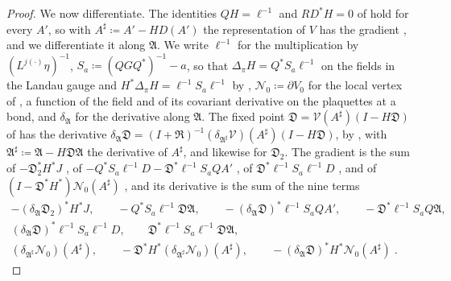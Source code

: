 \documentclass[11pt]{preprint}
\numberwithin{equation}{section}
\theoremstyle{definition}
\theoremstyle{remark}
\theoremstyle{plain}
\begin{document}
\begin{proof}
We now differentiate. The identities $QH = \ell^{-1}$ and $RD^*H = 0$ of \cite[(45)]{BalabanVAR} hold for every $A'$, so with $A^\sharp \coloneqq A' - HD(A')$ the representation \cite[(80)]{BalabanVAR} of $V$ has the gradient \cite[(85), (88)--(93)]{BalabanVAR}, and we differentiate it along $\mathfrak A$. We write $\ell^{-1}$ for the multiplication by $(L^{j(\cdot)}\eta)^{-1}$, $S_a \coloneqq (QGQ^*)^{-1} - a$, so that $\Delta_\pi H = Q^*S_a\ell^{-1}$ on the fields in the Landau gauge and $H^*\Delta_\pi H = \ell^{-1}S_a\ell^{-1}$ by \cite[(87)]{BalabanVAR}, $\mathcal N_0 \coloneqq \partial V_0$ for the local vertex of \cite[(90)--(93)]{BalabanVAR}, a function of the field and of its covariant derivative on the plaquettes at a bond, and $\delta_{\mathfrak A}$ for the derivative along $\mathfrak A$. The fixed point $\mathfrak D = \mathcal V(A^\sharp)(I - H\mathfrak D)$ of \cite[(67)]{BalabanVAR} has the derivative $\delta_{\mathfrak A}\mathfrak D = (I + \mathfrak R)^{-1}(\delta_{\mathfrak A^\sharp}\mathcal V)(A^\sharp)(I - H\mathfrak D)$, by \cite[(68)]{BalabanVAR}, with $\mathfrak A^\sharp \coloneqq \mathfrak A - H\mathfrak D\mathfrak A$ the derivative of $A^\sharp$, and likewise for $\mathfrak D_2$. The gradient is the sum of $-\mathfrak D_2^*H^*J$ \cite[(85)]{BalabanVAR}, of $-Q^*S_a\ell^{-1}D - \mathfrak D^*\ell^{-1}S_aQA'$ \cite[(88)]{BalabanVAR}, of $\mathfrak D^*\ell^{-1}S_a\ell^{-1}D$ \cite[(89)]{BalabanVAR}, and of $(I - \mathfrak D^*H^*)\mathcal N_0(A^\sharp)$ \cite[(90)--(93)]{BalabanVAR}, and its derivative is the sum of the nine terms
\begin{gather*}
    -(\delta_{\mathfrak A}\mathfrak D_2)^*H^*J,\qquad
    -Q^*S_a\ell^{-1}\mathfrak D\mathfrak A,\qquad
    -(\delta_{\mathfrak A}\mathfrak D)^*\ell^{-1}S_aQA',\qquad
    -\mathfrak D^*\ell^{-1}S_aQ\mathfrak A,\\
    (\delta_{\mathfrak A}\mathfrak D)^*\ell^{-1}S_a\ell^{-1}D,\qquad
    \mathfrak D^*\ell^{-1}S_a\ell^{-1}\mathfrak D\mathfrak A,\\
    (\delta_{\mathfrak A^\sharp}\mathcal N_0)(A^\sharp),\qquad
    -\mathfrak D^*H^*(\delta_{\mathfrak A^\sharp}\mathcal N_0)(A^\sharp),\qquad
    -(\delta_{\mathfrak A}\mathfrak D)^*H^*\mathcal N_0(A^\sharp)\;.
\end{gather*}

\end{proof}
\end{document}
